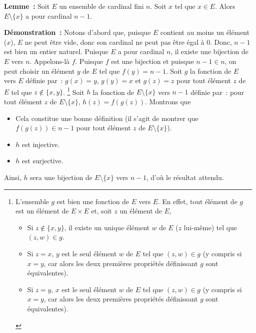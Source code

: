    \done 

\medskip 

\noindent\textbf{Lemme :} Soit $E$ un ensemble de cardinal fini $n$. 
    Soit $x$ tel que $x \in E$.
    Alors $E \setminus \lbrace x \rbrace$ a pour cardinal $n-1$.

\medskip

\noindent\textbf{Démonstration :} 
    Notons d'abord que, puisque $E$ contient au moins un élément ($x$), $E$ ne peut être vide, donc son cardinal ne peut pas être égal à $0$.
    Donc, $n-1$ est bien un entier naturel.
    Puisque $E$ a pour cardinal $n$, il existe une bijection de $E$ vers $n$. 
    Appelons-là $f$. 
    Puisque $f$ est une bijection et puisque $n-1 \in n$, on peut choisir un élément $y$ de $E$ tel que $f(y) = n-1$. 
    Soit $g$ la fonction de $E$ vers $E$ définie par : $g(x) = y$, $g(y) = x$ et $g(z) = z$ pour tout élément $z$ de $E$ tel que $z \notin \lbrace x, y \rbrace$.%
    \footnote{
        L'ensemble $g$ est bien une fonction de $E$ vers $E$.
        En effet, tout élément de $g$ est un élément de $E \times E$ et, soit $z$ un élément de $E$, 
        \begin{itemize}[nosep]
            \item Si $z \notin \lbrace x, y \rbrace$, il existe un unique élément $w$ de $E$ ($z$ lui-même) tel que $(z,w) \in g$.
            \item Si $z = x$, $y$ est le seul élément $w$ de $E$ tel que $(z,w) \in g$ (y compris si $x=y$, car alors les deux premières propriétés définissant $g$ sont équivalentes).
            \item Si $z = y$, $x$ est le seul élément $w$ de $E$ tel que $(z,w) \in g$ (y compris si $x=y$, car alors les deux premières propriétés définissant $g$ sont équivalentes).
        \end{itemize}
    }
    Soit $h$ la fonction de $E \setminus \lbrace x \rbrace$ vers $n-1$ définie par : pour tout élément $z$ de $E \setminus \lbrace x \rbrace$, $h(z) = f(g(z))$. 
    Montrons que 
    \begin{itemize}[nosep]
        \item Cela constitue une bonne définition (il s'agit de montrer que $f(g(z)) \in n-1$ pour tout élément $z$ de $E \setminus \lbrace x \rbrace$).
        \item $h$ est injective. 
        \item $h$ est surjective.
    \end{itemize}
    Ainsi, $h$ sera une bijection de $E \setminus \lbrace x \rbrace$ vers $n-1$, d'où le résultat attendu.

